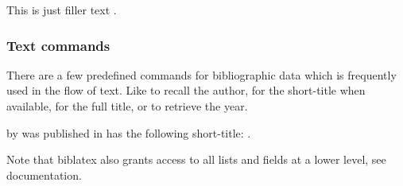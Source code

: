 This is just filler text \autocite{companion}.

\subsubsection*{Text commands}

There are a few predefined commands for bibliographic data which
is frequently used in the flow of text. 
Like  to recall the author,  for
the short-title when available,  for the full title, 
or  to retrieve the year.

 by \citeauthor{companion} was
published in \citeyear{companion} has the following short-title:
.

Note that biblatex also grants access to all lists and fields at a lower level,
see documentation.
